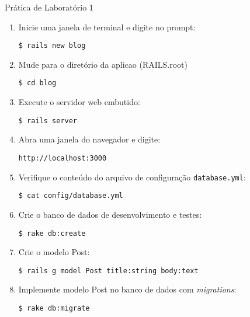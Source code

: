 \begin{frame}{Prática de Laboratório 1}
	\begin{enumerate}
		\item Inicie uma janela de terminal e digite no prompt:
			\begin{lstlisting}[style=BashInputBasicStyle]
			$ rails new blog
			\end{lstlisting}

		\item Mude para o diretório da aplicao (RAILS.root)
			\begin{lstlisting}[style=BashInputBasicStyle]
			$ cd blog
			\end{lstlisting}

		\item Execute o servidor web embutido:
		\begin{lstlisting}[style=BashInputBasicStyle]
			$ rails server
		\end{lstlisting}
		
		\item Abra uma janela do navegador e digite:
		\begin{lstlisting}[style=BashInputBasicStyle]
			http://localhost:3000
		\end{lstlisting}

		\item Verifique o conteúdo do arquivo de configuração \verb|database.yml|:
		\begin{lstlisting}[style=BashInputBasicStyle]
			$ cat config/database.yml
		\end{lstlisting}

		\item Crie o banco de dados de desenvolvimento e testes:
		\begin{lstlisting}[style=BashInputBasicStyle]
			$ rake db:create
		\end{lstlisting}

		\item Crie o modelo Post:
		\begin{lstlisting}[style=BashInputBasicStyle]
			$ rails g model Post title:string body:text
		\end{lstlisting}

		\item Implemente modelo Post no banco de dados com {\it migrations}:
		\begin{lstlisting}[style=BashInputBasicStyle]
			$ rake db:migrate
		\end{lstlisting}


\end{enumerate}
\end{frame}
